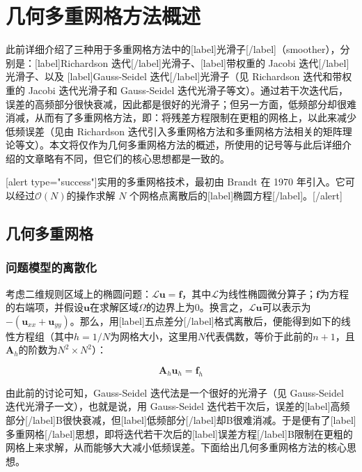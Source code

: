 \documentclass[12pt, UTF8, nofonts]{ctexart}
\begin{document}

\section*{几何多重网格方法概述}

此前详细介绍了三种用于多重网格方法中的[label]光滑子[/label]（smoother），分别是：[label]Richardson 迭代[/label]光滑子、[label]带权重的 Jacobi 迭代[/label]光滑子、以及 [label]Gauss-Seidel 迭代[/label]光滑子（见 Richardson 迭代和带权重的 Jacobi 迭代光滑子和 Gauss-Seidel 迭代光滑子等文）。通过若干次迭代后，误差的高频部分很快衰减，因此都是很好的光滑子；但另一方面，低频部分却很难消减，从而有了多重网格方法，即：将残差方程限制在更粗的网格上，以此来减少低频误差（见由 Richardson 迭代引入多重网格方法和多重网格方法相关的矩阵理论等文）。本文将仅作为几何多重网格方法的概述，所使用的记号等与此后详细介绍的文章略有不同，但它们的核心思想都是一致的。

[alert type="success"]实用的多重网格技术，最初由 Brandt 在 1970 年引入。它可以经过$\mathcal{O}(N)$的操作求解 $N$ 个网格点离散后的[label]椭圆方程[/label]。[/alert]

\subsection*{几何多重网格}

\subsubsection*{问题模型的离散化}

考虑二维规则区域上的椭圆问题：$\mathcal{L}\boldsymbol{u}=\boldsymbol{f}$，其中$\mathcal{L}$为线性椭圆微分算子；$\boldsymbol{f}$为方程的右端项，并假设$\boldsymbol{u}$在求解区域$\Omega$的边界上为$0$。换言之，$\mathcal{L}\boldsymbol{u}$可以表示为$-(\boldsymbol{u}_{xx}+\boldsymbol{u}_{yy})$。那么，用[label]五点差分[/label]格式离散后，便能得到如下的线性方程组（其中$h=1/N$为网格大小，这里用$N$代表偶数，等价于此前的$n+1$，且$\boldsymbol{A}_h$的阶数为$N^2 \times N^2$）：

\begin{equation}
  \label{eq:5ptls}
  \boldsymbol{A}_h\boldsymbol{u}_h = \boldsymbol{f}_h
\end{equation}

由此前的讨论可知，Gauss-Seidel 迭代法是一个很好的光滑子（见 Gauss-Seidel 迭代光滑子一文），也就是说，用 Gauss-Seidel 迭代若干次后，误差的[label]高频部分[/label]B很快衰减，但[label]低频部分[/label]却B很难消减。于是便有了[label]多重网格[/label]思想，即将迭代若干次后的[label]误差方程[/label]B限制在更粗的网格上来求解，从而能够大大减小低频误差。下面给出几何多重网格方法的核心思想。
\end{document}
